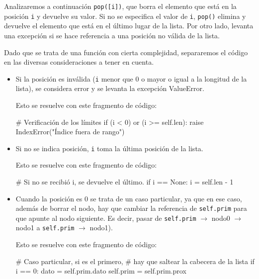 Analizaremos a continuación \lstinline|pop([i])|, que borra el elemento que
está en la posición \lstinline!i! y devuelve su valor. Si no se especifica
el valor de \lstinline!i!, \lstinline|pop()| elimina y devuelve el elemento
que está en el último lugar de la lista.  Por otro lado, levanta una
excepción si se hace referencia a una posición no válida de la lista.

Dado que se trata de una función con cierta complejidad, separaremos el
código en las diversas consideraciones a tener en cuenta.

\begin{itemize}

\item Si la posición es inválida (\lstinline!i! menor que $0$ o mayor o
igual a la longitud de la lista), se considera error y se levanta la
excepción ValueError.

Esto se resuelve con este fragmento de código:

\begin{codigo-python-sn}
        # Verificación de los límites
        if (i < 0) or (i >= self.len):
            raise IndexError("Índice fuera de rango")
\end{codigo-python-sn}

\item Si no se indica posición, \lstinline!i! toma la última posición de la lista.

Esto se resuelve con este fragmento de código:
\begin{codigo-python-sn}
        # Si no se recibió i, se devuelve el último.
        if i == None:
            i = self.len - 1
\end{codigo-python-sn}

\item Cuando la posición es $0$ se trata de un caso particular, ya que en ese
caso, además de borrar el nodo, hay que cambiar la referencia de
\lstinline!self.prim! para que apunte al nodo siguiente.  Es decir, pasar de
\lstinline!self.prim! $\rightarrow$ nodo0 $\rightarrow$ nodo1 a
\lstinline!self.prim! $\rightarrow$ nodo1).

Esto se resuelve con este fragmento de código:

\begin{codigo-python-sn}
        # Caso particular, si es el primero, 
        # hay que saltear la cabecera de la lista
        if i == 0:
            dato = self.prim.dato
            self.prim = self.prim.prox
\end{codigo-python-sn}


\end{itemize}
